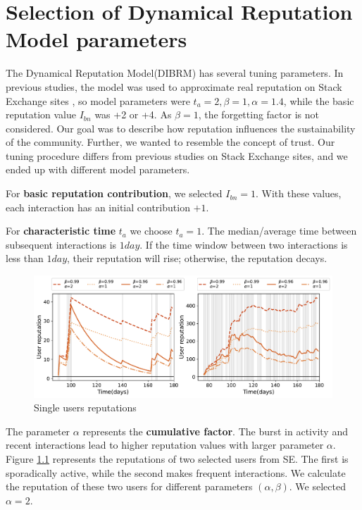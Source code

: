 \chapter{Selection of Dynamical Reputation Model parameters}
\label{App:parameters}

The Dynamical Reputation Model(DIBRM) has several tuning parameters. In previous studies, the model \cite{melnikov2018toward,yashkina2020} was used to approximate real reputation on Stack Exchange sites \cite{yashkina2020}, so model parameters were $t_a =2, \beta = 1, \alpha = 1.4$, while the basic reputation value $I_{bn}$ was +2 or +4. As $\beta=1$, the forgetting factor is not considered. Our goal was to describe how reputation influences the sustainability of the community. Further, we wanted to resemble the concept of trust. Our tuning procedure differs from previous studies on Stack Exchange sites, and we ended up with different model parameters. 

For \textbf{basic reputation contribution}, we selected $I_{bn}=1$. With these values, each interaction has an initial contribution $+1$. 

For \textbf{characteristic time} $t_a$ we choose $t_a=1$. The median/average time between subsequent interactions is $1 day$. If the time window between two interactions is less than $1 day$, their reputation will rise; otherwise, the reputation decays.

\begin{figure}[h]
	\centering
	\includegraphics[width=0.8\linewidth]{figures/stackexchange/single_user_reputation.pdf}
	\caption[Single users reputations.]{Single users reputations }
	\label{fig:singleuser}
\end{figure} 

The {parameter $\alpha$} represents the \textbf{cumulative factor}. The burst in activity and recent interactions lead to higher reputation values with larger parameter $\alpha$. Figure \ref{fig:singleuser} represents the reputations of two selected users from SE. The first is sporadically active, while the second makes frequent interactions. We calculate the reputation of these two users for different parameters $(\alpha, \beta)$. We selected $\alpha=2$.  

